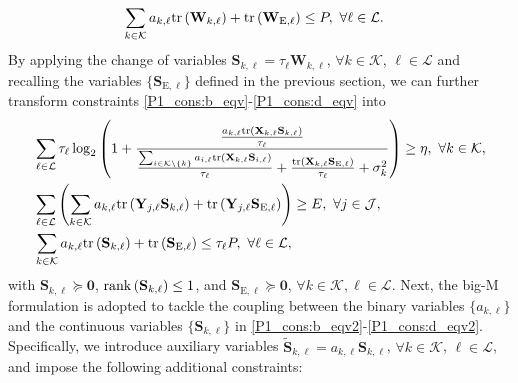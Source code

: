 \documentclass[12pt,draftclsnofoot, onecolumn]{IEEEtran}
\theoremstyle{plain}
\begin{document}
\begin{sloppypar}
{\begin{align}
&  \sum_{k\in\mathcal K}a_{k,\ell}{\rm tr}\left( \mathbf W_{k,\ell}\right)  + {\rm tr}\left(\mathbf W_{\mathrm E,\ell} \right) \leq P, \ \forall \ell\in\mathcal L. \label{P1_cons:d_eqv}
\end{align}}%
By applying the change of variables $\mathbf S_{k,\ell} = \tau_\ell\mathbf W_{k,\ell}$, $\forall k\in\mathcal K$, $\ell\in\mathcal L$ and recalling the variables $\{\mathbf S_{\mathrm E, \ell}\}$ defined in the previous section, we can further transform constraints \eqref{P1_cons:b_eqv}-\eqref{P1_cons:d_eqv} into 
{\setlength\abovedisplayskip{7pt}
\setlength\belowdisplayskip{6pt}  
\begin{align}
& \sum_{\ell\in\mathcal L}\tau_\ell\log_2\left(1 + \frac{\frac{a_{k,\ell}{\rm tr}\left(\mathbf X_{k,\ell}\mathbf S_{k,\ell}\right)}{\tau_\ell}}{\frac{\sum_{i\in \mathcal K\backslash\{k\}}a_{i,\ell}{\rm tr}\left(\mathbf X_{k,\ell}\mathbf S_{i,\ell}\right)}{\tau_\ell} + \frac{{\rm tr}\left(\mathbf X_{k,\ell}\mathbf S_{\mathrm E,\ell}\right)}{\tau_\ell} + \sigma_k^2} \right) \geq \eta, \ \forall k\in\mathcal K, \label{P1_cons:b_eqv2}\\ 
& \sum_{\ell\in\mathcal L}\left(\sum_{k\in\mathcal K}a_{k,\ell}{\rm tr}\left(\mathbf Y_{j,\ell}\mathbf S_{k,\ell}\right) + {\rm tr}\left(\mathbf Y_{j,\ell}\mathbf S_{\mathrm E, \ell} \right) \right) \geq E, \ \forall j\in\mathcal J, \label{P1_cons:c_eqv2}\\
&  \sum_{k\in\mathcal K}a_{k,\ell}{\rm tr}\left( \mathbf S_{k,\ell}\right)  + {\rm tr}\left(\mathbf S_{\mathrm E,\ell} \right)  \leq \tau_\ell P, \ \forall \ell\in\mathcal L, \label{P1_cons:d_eqv2}
\end{align}}%
with $\mathbf S_{k,\ell}\succeq \mathbf 0$, ${\rm rank}\left(\mathbf S_{k,\ell}\right) \leq 1$, and $\mathbf S_{\mathrm E, \ell}\succeq \mathbf 0$, $\forall k\in\mathcal K, \ell\in\mathcal L$.
Next, the big-M formulation \cite{2016_Kwan_big-M} is adopted to tackle the coupling between the binary variables $\{a_{k,\ell}\}$ and the continuous variables $\{\mathbf S_{k,\ell}\}$ in \eqref{P1_cons:b_eqv2}-\eqref{P1_cons:d_eqv2}. Specifically, we introduce auxiliary variables $\tilde{\mathbf S}_{k,\ell} = a_{k,\ell}\mathbf S_{k,\ell}$, $\forall k\in\mathcal K$, $\ell\in\mathcal L$, and impose the following additional constraints: 

\end{sloppypar}
\end{document}
